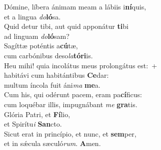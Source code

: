\evenverse Dómine, líbera ánimam meam a lábiis i\textbf{ní}quis,~\*\\
\evenverse et a lingua \textit{do}\textbf{ló}sa.\\
\oddverse Quid detur tibi, aut quid apponátur \textbf{ti}bi~\*\\
\oddverse ad linguam \textit{do}\textbf{ló}sam?\\
\evenverse Sagíttæ poténtis a\textbf{cú}tæ,~\*\\
\evenverse cum carbónibus deso\textit{la}\textbf{tó}\textbf{ri}is.\\
\oddverse Heu mihi! quia incolátus meus prolongátus est:~+\\
\oddverse  habitávi cum habitántibus \textbf{Ce}dar:~\*\\
\oddverse multum íncola fuit áni\textit{ma} \textbf{me}a.\\
\evenverse Cum his, qui odérunt pacem, eram pa\textbf{cí}ficus:~\*\\
\evenverse cum loquébar illis, impugnábant \textit{me} \textbf{gra}tis.\\
\oddverse Glória Patri, et \textbf{Fí}lio,~\*\\
\oddverse et Spirítu\textit{i} \textbf{San}cto.\\
\evenverse Sicut erat in princípio, et nunc, et \textbf{sem}per,~\*\\
\evenverse et in sǽcula sæculó\textit{rum}. \textbf{A}men.\\

